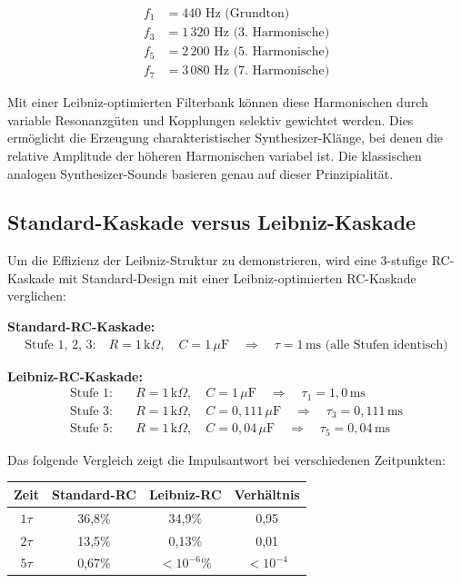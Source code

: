 \documentclass[a4paper,12pt,twoside]{report}
\theoremstyle{definition}
\begin{document}
\begin{align}
	f_1 &= 440 \text{ Hz (Grundton)} \\
	f_3 &= 1\,320 \text{ Hz (3. Harmonische)} \\
	f_5 &= 2\,200 \text{ Hz (5. Harmonische)} \\
	f_7 &= 3\,080 \text{ Hz (7. Harmonische)}
\end{align}

Mit einer Leibniz-optimierten Filterbank können diese Harmonischen durch variable Resonanzgüten und Kopplungen selektiv gewichtet werden. Dies ermöglicht die Erzeugung charakteristischer Synthesizer-Klänge, bei denen die relative Amplitude der höheren Harmonischen variabel ist. Die klassischen analogen Synthesizer-Sounds basieren genau auf dieser Prinzipialität.

\subsection{Standard-Kaskade versus Leibniz-Kaskade}

Um die Effizienz der Leibniz-Struktur zu demonstrieren, wird eine 3-stufige RC-Kaskade mit Standard-Design mit einer Leibniz-optimierten RC-Kaskade verglichen:

\textbf{Standard-RC-Kaskade:}
\begin{align}
	\text{Stufe 1, 2, 3:} \quad R = 1\,\text{k}\Omega, \quad C = 1\,\mu\text{F} \quad \Rightarrow \quad \tau = 1\,\text{ms (alle Stufen identisch)}
\end{align}

\textbf{Leibniz-RC-Kaskade:}
\begin{align}
	\text{Stufe 1:} &\quad R = 1\,\text{k}\Omega, \quad C = 1\,\mu\text{F} \quad \Rightarrow \quad \tau_1 = 1,0\,\text{ms} \\
	\text{Stufe 3:} &\quad R = 1\,\text{k}\Omega, \quad C = 0,111\,\mu\text{F} \quad \Rightarrow \quad \tau_3 = 0,111\,\text{ms} \\
	\text{Stufe 5:} &\quad R = 1\,\text{k}\Omega, \quad C = 0,04\,\mu\text{F} \quad \Rightarrow \quad \tau_5 = 0,04\,\text{ms}
\end{align}

Das folgende Vergleich zeigt die Impulsantwort bei verschiedenen Zeitpunkten:

\begin{center}
\begin{tabular}{c|c|c|c}
Zeit & Standard-RC & Leibniz-RC & Verhältnis \\
\hline
$1\tau$ & 36,8\% & 34,9\% & 0,95 \\
$2\tau$ & 13,5\% & 0,13\% & 0,01 \\
$5\tau$ & 0,67\% & $< 10^{-6}\%$ & $< 10^{-4}$ \\
\end{tabular}
\end{center}
\end{document}
